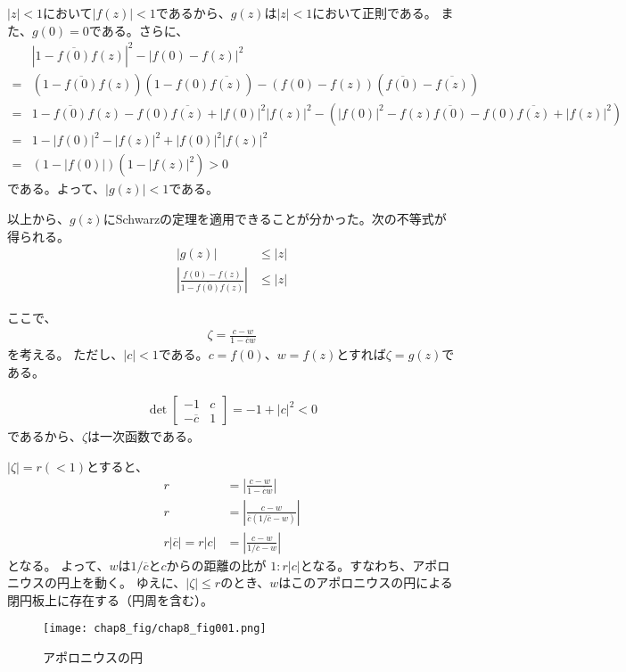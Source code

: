 $|z|<1$において$|f(z)|<1$であるから、$g(z)$は$|z|<1$において正則である。
また、$g(0)=0$である。さらに、
\begin{align*}
    &|1-\overline{f(0)}f(z)|^2-|f(0)-f(z)|^2\\
    =&(1-\overline{f(0)}f(z))(1-f(0)\overline{f(z)})-(f(0)-f(z))(\overline{f(0)}-\overline{f(z)})\\
    =&1-\overline{f(0)}f(z)-f(0)\overline{f(z)}+|f(0)|^2|f(z)|^2-(|f(0)|^2-f(z)\overline{f(0)}-f(0)\overline{f(z)}+|f(z)|^2)\\
    =&1-|f(0)|^2-|f(z)|^2+|f(0)|^2|f(z)|^2\\
    =&(1-|f(0)|)(1-|f(z)|^2)>0
\end{align*}
である。よって、$|g(z)|<1$である。

以上から、$g(z)$にSchwarzの定理を適用できることが分かった。次の不等式が得られる。
\begin{align*}
    |g(z)|&\le|z|\\
    \left|\frac{f(0)-f(z)}{1-\overline{f(0)}f(z)}\right|&\le|z|
\end{align*}

ここで、
\begin{align*}
    \zeta=\frac{c-w}{1-\overline{c}w}
\end{align*}
を考える。
ただし、$|c|<1$である。$c=f(0)$、$w=f(z)$とすれば$\zeta=g(z)$である。

\begin{align*}
    \det\begin{bmatrix}
        -1&c\\-\overline{c}&1
    \end{bmatrix}
    =-1+|c|^2<0
\end{align*}
であるから、$\zeta$は一次函数である。

$|\zeta|=r(<1)$とすると、
\begin{align*}
    r&=\left|\frac{c-w}{1-\overline{c}w}\right|\\
    r&=\left|\frac{c-w}{\overline{c}(1/\overline{c}-w)}\right|\\
    r|\overline{c}|=r|c|&=\left|\frac{c-w}{1/\overline{c}-w}\right|
\end{align*}
となる。
よって、$w$は$1/\overline{c}$と$c$からの距離の比が
$1:r|c|$となる。すなわち、アポロニウスの円上を動く。
ゆえに、$|\zeta|\le r$のとき、$w$はこのアポロニウスの円による閉円板上に存在する（円周を含む）。
\begin{figure}[h]
    \centering
    \texttt{[image: chap8\_fig/chap8\_fig001.png]}
    \caption{アポロニウスの円}
    \label{fig:chap8_apo}
\end{figure}

